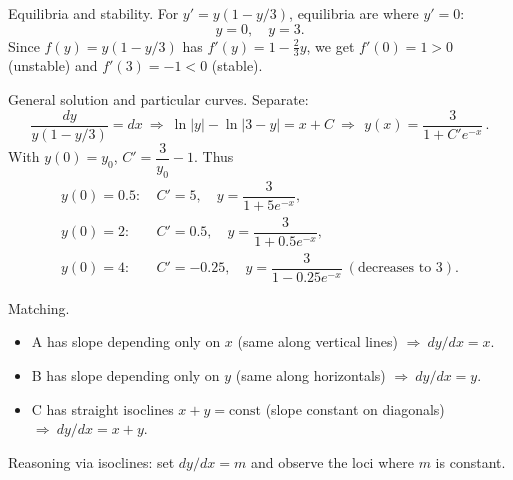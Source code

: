 \documentclass[11pt]{article}
\def\textbf#1{#1}%
\begin{document}
\begin{solution}
\textbf{Equilibria and stability.}
For $y' = y(1-y/3)$, equilibria are where $y'=0$:
\[
y=0,\quad y=3.
\]
Since $f(y)=y(1-y/3)$ has $f'(y)=1-\tfrac{2}{3}y$, we get
$f'(0)=1>0$ (unstable) and $f'(3)=-1<0$ (stable).

\textbf{General solution and particular curves.}
Separate:
\[
\frac{dy}{y(1-y/3)}=dx
\ \Rightarrow\ 
\ln|y|-\ln|3-y|=x+C
\ \Rightarrow\ 
\boxed{\,y(x)=\dfrac{3}{1+C'e^{-x}}\,}.
\]
With $y(0)=y_0$, $C'=\dfrac{3}{y_0}-1$.
Thus
\[
\begin{aligned}
y(0)=0.5:&\ C'=5,\quad y=\dfrac{3}{1+5e^{-x}},\\
y(0)=2:&\ C'=0.5,\quad y=\dfrac{3}{1+0.5e^{-x}},\\
y(0)=4:&\ C'=-0.25,\quad y=\dfrac{3}{1-0.25e^{-x}}\ (\text{decreases to }3).
\end{aligned}
\]

\begin{center}
\end{center}
\end{solution}

\begin{solution}
\textbf{Matching.}
\begin{itemize}
\item \textbf{A} has slope depending only on $x$ (same along vertical lines) $\Rightarrow\ \boxed{dy/dx=x}$.
\item \textbf{B} has slope depending only on $y$ (same along horizontals) $\Rightarrow\ \boxed{dy/dx=y}$.
\item \textbf{C} has straight isoclines $x+y=\text{const}$ (slope constant on diagonals)
      $\Rightarrow\ \boxed{dy/dx=x+y}$.
\end{itemize}
Reasoning via isoclines: set $dy/dx=m$ and observe the loci where $m$ is constant.
\end{solution}
\end{document}

